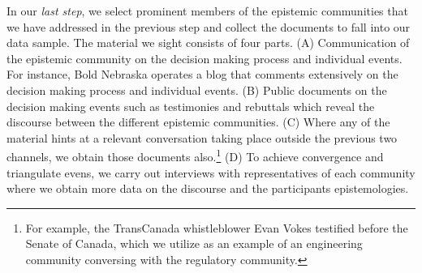 \documentclass{article}
\begin{document}
	In our \textit{last step}, we select prominent members of the epistemic communities that we have addressed in the previous step and collect the documents to fall into our data sample. The material we sight consists of four parts. (A) Communication of the epistemic community on the decision making process and individual events. For instance, Bold Nebraska operates a blog that comments extensively on the decision making process and individual events. (B) Public documents on the decision making events such as testimonies and rebuttals which reveal the discourse between the different epistemic communities. (C) Where any of the material hints at a relevant conversation taking place outside the previous two channels, we obtain those documents also.\footnote{For example, the TransCanada whistleblower Evan Vokes testified before the Senate of Canada, which we utilize as an example of an engineering community conversing with the regulatory community.} (D) To achieve convergence and triangulate evens, we carry out interviews with representatives of each community where we obtain more data on the discourse and the participants epistemologies.


\end{document}
